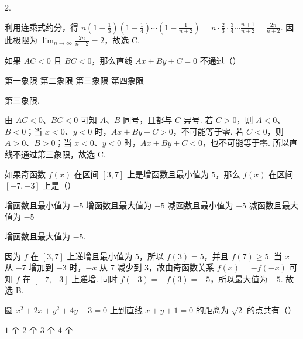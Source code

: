 \begin{answer}
\(2\).
\end{answer}

\begin{solution}
利用连乘式约分，得
\(n\left(1-\frac13\right)\left(1-\frac14\right)\cdots\left(1-\frac1{n+2}\right)=n\cdot\frac23\cdot\frac34\cdots\frac{n+1}{n+2}=\frac{2n}{n+2}\). 因此极限为 \(\displaystyle\lim_{n\to\infty}\frac{2n}{n+2}=2\)，故选 C.
\end{solution}

\begin{problem}
如果 \(AC < 0\) 且 \(BC < 0\)，那么直线 \(Ax + By + C = 0\) 不通过（\quad）

\choices
    {第一象限}
    {第二象限}
    {第三象限}
    {第四象限}
\end{problem}

\begin{answer}
第三象限.
\end{answer}

\begin{solution}
由 \(AC<0\)、\(BC<0\) 可知 \(A\)、\(B\) 同号，且都与 \(C\) 异号. 若 \(C>0\)，则 \(A<0\)、\(B<0\)；当 \(x<0\)、\(y<0\) 时，\(Ax+By+C>0\)，不可能等于零. 若 \(C<0\)，则 \(A>0\)、\(B>0\)；当 \(x<0\)、\(y<0\) 时，\(Ax+By+C<0\)，也不可能等于零. 所以直线不通过第三象限，故选 C.
\end{solution}

\begin{problem}
如果奇函数 \(f(x)\) 在区间 \([3,7]\) 上是增函数且最小值为 \(5\)，那么 \(f(x)\) 在区间 \([-7,-3]\) 上是（\quad）

\choices
    {增函数且最小值为 \(-5\)}
    {增函数且最大值为 \(-5\)}
    {减函数且最小值为 \(-5\)}
    {减函数且最大值为 \(-5\)}
\end{problem}

\begin{answer}
增函数且最大值为 \(-5\).
\end{answer}

\begin{solution}
因为 \(f\) 在 \([3,7]\) 上递增且最小值为 \(5\)，所以 \(f(3)=5\)，并且 \(f(7)\geq5\). 当 \(x\) 从 \(-7\) 增加到 \(-3\) 时，\(-x\) 从 \(7\) 减少到 \(3\)，故由奇函数关系 \(f(x)=-f(-x)\) 可知 \(f\) 在 \([-7,-3]\) 上递增. 同时 \(f(-3)=-f(3)=-5\)，所以最大值为 \(-5\). 故选 B.
\end{solution}

\begin{problem}
圆 \(x^{2} + 2x + y^{2} + 4y - 3 = 0\) 上到直线 \(x + y + 1 = 0\) 的距离为 \(\sqrt{2}\) 的点共有（\quad）

\choices
    {\(1\) 个}
    {\(2\) 个}
    {\(3\) 个}
    {\(4\) 个}
\end{problem}

